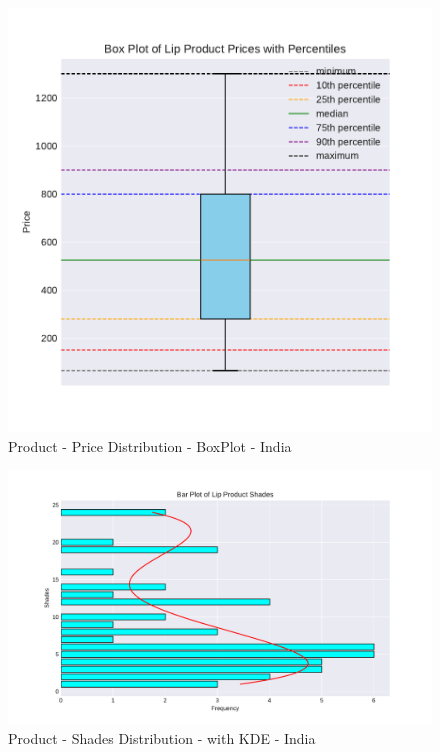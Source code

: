 \documentclass{article}
\begin{document}
\begin{center}
    \begin{figure}[htbp]
        \centering
        \includegraphics[scale=0.6]{../images/India-graphs/Box_Prices.pdf}
        \caption{Product - Price Distribution - BoxPlot - India}
        \label{Box_Prices_ind}
    \end{figure}

    \begin{figure}[htbp]
        \centering
        \includegraphics[scale=0.6]{../images/Indonesia-graphs/KDE_Shades.pdf}
        \caption{Product - Shades Distribution - with KDE - India}
        \label{KDE_Shades_ind}
    \end{figure}
    \restoregeometry

\end{center}
\restoregeometry
\end{document}

